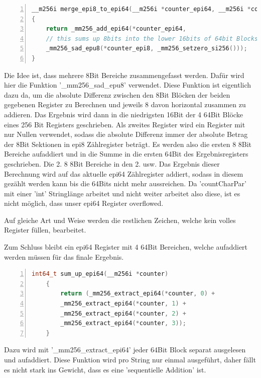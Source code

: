 \documentclass[plainarticle,zihtitle,german,final,hyperref,utf8]{zihpub}
\begin{document}
\begin{lstlisting}[language=c, numbers=left]
__m256i merge_epi8_to_epi64(__m256i *counter_epi64, __m256i *counter_epi8)
{
	return _mm256_add_epi64(*counter_epi64, 
	// this sums up 8bits into the lower 16bits of 64bit Blocks
	_mm256_sad_epu8(*counter_epi8, _mm256_setzero_si256()));
}
\end{lstlisting}

Die Idee ist, dass mehrere 8Bit Bereiche zusammengefasst werden. Dafür wird hier die Funktion '\_mm256\_sad\_epu8' verwendet. Diese Funktion ist eigentlich dazu da, um die absolute Differenz zwischen den 8Bit Blöcken der beiden gegebenen Register zu Berechnen und jeweils 8 davon horizontal zusammen zu addieren. Das Ergebnis wird dann in die niedrigsten 16Bit der 4 64Bit Blöcke eines 256 Bit Registers geschrieben. Als zweites Register wird ein Register mit nur Nullen verwendet, sodass die absolute Differenz immer der absolute Betrag der 8Bit Sektionen in epi8 Zählregister beträgt.
Es werden also die ersten 8 8Bit Bereiche aufaddiert und in die Summe in die ersten 64Bit des Ergebnisregisters geschrieben. Die 2. 8 8Bit Bereiche in den 2. usw.
Das Ergebnis dieser Berechnung wird auf das aktuelle epi64 Zählregister addiert, sodass in diesem gezählt werden kann bis die 64Bits nicht mehr aussreichen. Da 'countCharPar' mit einer 'int' Stringlänge arbeitet und nicht weiter arbeitet also diese, ist es nicht möglich, dass unser epi64 Register overflowed.

Auf gleiche Art und Weise werden die restlichen Zeichen, welche kein volles Register füllen, bearbeitet.

Zum Schluss bleibt ein epi64 Register mit 4 64Bit Bereichen, welche aufaddiert werden müssen für das finale Ergebnis.
\begin{lstlisting}[language=c, numbers=left]
	int64_t sum_up_epi64(__m256i *counter)
	{
		return (_mm256_extract_epi64(*counter, 0) +
		_mm256_extract_epi64(*counter, 1) +
		_mm256_extract_epi64(*counter, 2) +
		_mm256_extract_epi64(*counter, 3));
	}
\end{lstlisting}
Dazu wird mit '\_mm256\_extract\_epi64' jeder 64Bit Block separat ausgelesen und aufaddiert. Diese Funktion wird pro String nur einmal ausgeführt, daher fällt es nicht stark ins Gewicht, dass es eine 'sequentielle Addition' ist.
\end{document}
